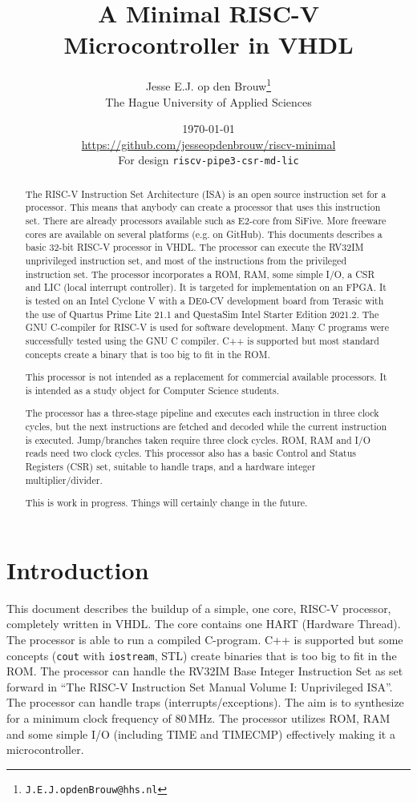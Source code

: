 \documentclass[12pt]{article}
\author{Jesse E.J. op den Brouw\thanks{\texttt{J.E.J.opdenBrouw@hhs.nl}}\\[2ex]The Hague University of Applied Sciences}
\title{A Minimal RISC-V Microcontroller in VHDL}
\date{\today\\[2ex]\normalsize\url{https://github.com/jesseopdenbrouw/riscv-minimal}\\[2ex]For design \texttt{riscv-pipe3-csr-md-lic}}
\begin{document}
\maketitle

\vfill
\begin{abstract}
\baselineskip
\noindent
The RISC-V Instruction Set Architecture (ISA) is an open source instruction set for a processor. This means that anybody can create a processor that uses this instruction set. There are already processors available such as E2-core from SiFive. More freeware cores are available on several platforms (e.g. on GitHub). This documents describes a basic 32-bit RISC-V processor in VHDL. The processor can execute the RV32IM unprivileged instruction set, and most of the instructions from the privileged instruction set. The processor incorporates a ROM, RAM, some simple I/O, a CSR and LIC (local interrupt controller). It is targeted for implementation on an FPGA. It is tested on an Intel Cyclone V with a DE0-CV development board from Terasic with the use of Quartus Prime Lite 21.1 and QuestaSim Intel Starter Edition 2021.2. The GNU C-compiler for RISC-V is used for software development. Many C programs were successfully tested using the GNU C compiler. C++ is supported but most standard concepts create a binary that is too big to fit in the ROM.

\noindent
This processor is not intended as a replacement for commercial available processors. It is intended as a study object for Computer Science students.

\noindent
The processor has a three-stage pipeline and executes each instruction in three clock cycles, but the next instructions are fetched and decoded while the current instruction is executed. Jump/branches taken require three clock cycles. ROM, RAM and I/O reads need two clock cycles. This processor also has a basic Control and Status Registers (CSR) set, suitable to handle traps, and a hardware integer multiplier/divider.

\noindent
This is work in progress. Things will certainly change in the future.
\end{abstract}
\vfill

\clearpage
\tableofcontents

\clearpage
\section{Introduction}
This document describes the buildup of a simple, one core, RISC-V processor, completely written in VHDL. The core contains one HART (Hardware Thread). The processor is able to run a compiled C-program. C++ is supported but some concepts (\texttt{cout} with \texttt{iostream}, STL) create binaries that is too big to fit in the ROM. The processor can handle the RV32IM Base Integer Instruction Set as set forward in ``The RISC-V Instruction Set Manual Volume I: Unprivileged ISA''. The processor can handle traps (interrupts/exceptions). The aim is to synthesize for a minimum clock frequency of 80\,MHz. The processor utilizes ROM, RAM and some simple I/O (including TIME and TIMECMP) effectively making it a microcontroller.
\end{document}
